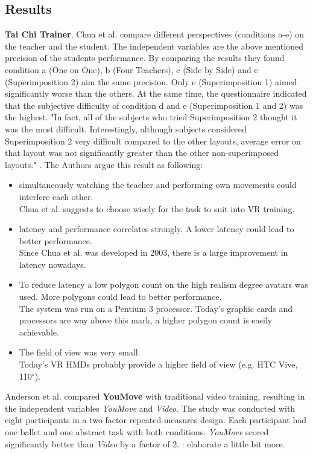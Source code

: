 \subsection{Results}
\textbf{Tai Chi Trainer}. Chua et al. compare different perspectives (conditions a-e) on the teacher and the student. The independent variables are the above mentioned precision of the students performance. By comparing the results they found condition a (One on One), b (Four Teachers), c (Side by Side) and e (Superimposition 2) aim the same precision. Only e (Superimposition 1) aimed significantly worse than the others. At the same time, the questionnaire indicated that the subjective difficulty of condition d and e (Superimposition 1 and 2) was the highest. "In fact, all of the subjects who tried Superimposition 2 thought it was the most difficult. Interestingly, although subjects considered Superimposition 2 very difficult compared to the other layouts, average error on that layout was not significantly greater than the other non-superimposed layouts." \cite{Chua}. The Authors argue this result as following:
\begin{itemize}
	\item simultaneously watching the teacher and performing own movements could interfere each other.\\
	Chua et al. suggests to choose wisely for the task to suit into VR training.
	\item latency and performance correlates strongly. A lower latency could lead to better performance.\\
	Since Chua et al. \cite{Chua} was developed in 2003, there is a large improvement in latency nowadays.
	\item To reduce latency a low polygon count on the high realism degree avatars was used. More polygons could lead to better performance.\\
	The system was run on a Pentium 3 processor. Today's graphic cards and processors are way above this mark, a higher polygon count is easily achievable.
	\item The field of view was very small.\\
	Today's VR HMDs probably provide a higher field of view (e.g. HTC Vive, 110$^\circ$).
\end{itemize}
Anderson et al. compared \textbf{YouMove} with traditional video training, resulting in the independent variables \textit{YouMove} and \textit{Video}. The study was conducted with eight participants in a two factor repeated-measures design. Each participant had one ballet and one abstract task with both conditions. \textit{YouMove} scored significantly better than \textit{Video} by a factor of 2. \todo: elaborate a little bit more.\\ \\
